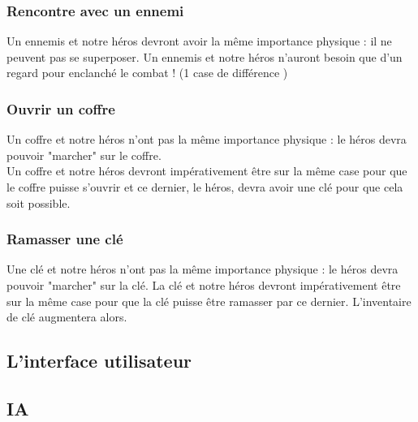 \documentclass[a4paper 12pts]{article}
\begin{document}
\subsubsection {Rencontre avec un ennemi}

\vspace{0.75cm}
 
Un ennemis et notre héros devront avoir la même importance physique : il ne peuvent pas se superposer.
Un ennemis et notre héros n'auront besoin que d'un regard pour enclanché le combat ! (1 case de différence )

\vspace{0.75cm}

\subsubsection {Ouvrir un coffre}

\vspace{0.75cm}

Un coffre et notre héros n'ont pas la même importance physique : le héros devra pouvoir "marcher" sur le coffre.\\
Un coffre et notre héros devront impérativement être sur la même case pour que le coffre puisse s'ouvrir et ce dernier, le héros, devra avoir une clé pour que cela soit possible.

\vspace{0.75cm}

\subsubsection {Ramasser une clé}

\vspace{0.75cm}
Une clé et notre héros n'ont pas la même importance physique : le héros devra pouvoir "marcher" sur la clé.
La clé et notre héros devront impérativement être sur la même case pour que la clé puisse être ramasser par ce dernier.
L'inventaire de clé augmentera alors.

\vspace{0.75cm} 
\subsection{L'interface utilisateur}

\subsection{IA}
\end{document}
